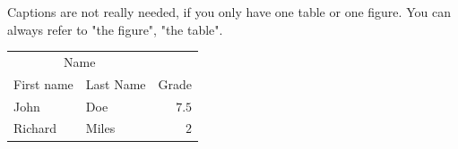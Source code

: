 \documentclass[paper=a4, fontsize=12pt, twocolumn]{article}	 %
\begin{document}
Captions are not really needed, if you only have one table or one figure. You can always refer to "the figure", "the table".

\begin{table}[bt!]
\centering
\begin{tabular}{llr}
\toprule
\multicolumn{2}{c}{Name} \\
\cmidrule(r){1-2}
First name & Last Name & Grade \\
\midrule
John & Doe & $7.5$ \\
Richard & Miles & $2$ \\
\bottomrule
\end{tabular}
\end{table}

\lipsum[9] %

\end{document}
